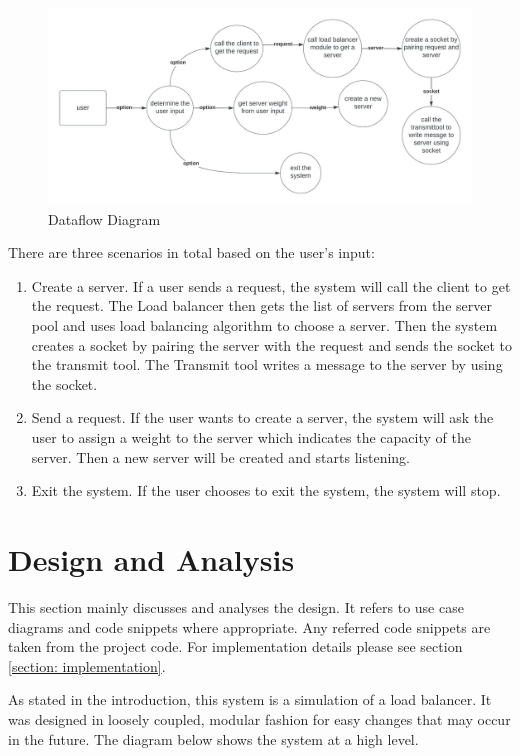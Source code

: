 \documentclass[12pt]{article}
\begin{document}
\begin{figure}[H]
\centering
\includegraphics[width=\linewidth]{images/dataflow_diagram.jpeg}
\caption{Dataflow Diagram}
\label{fig:Data_flow_diagram}
\end{figure}
There are three scenarios in total based on the user's input:
\begin{enumerate}
\item Create a server.
If a user sends a request, the system will call the client to get the request. The Load balancer then gets the list of servers from the server pool and uses load balancing algorithm to choose a server. Then the system creates a socket by pairing the server with the request and sends the socket to the transmit tool. The Transmit tool writes a message to the server by using the socket. 
\item Send a request.
If the user wants to create a server, the system will ask the user to assign a weight to the server which indicates the capacity of the server. Then a new server will be created and starts listening.
\item Exit the system.
If the user chooses to exit the system, the system will stop.
\end{enumerate}

\section{Design and Analysis}
\label{section: design_and_analysis}
This section mainly discusses and analyses the design. It refers to use case diagrams and code snippets where appropriate. Any referred code snippets are taken from the project code. For implementation details please see section \ref{section: implementation}.

As stated in the introduction, this system is a simulation of a load balancer. It was designed in loosely coupled, modular fashion for easy changes that may occur in the future. The diagram below shows the system at a high level.
\end{document}
